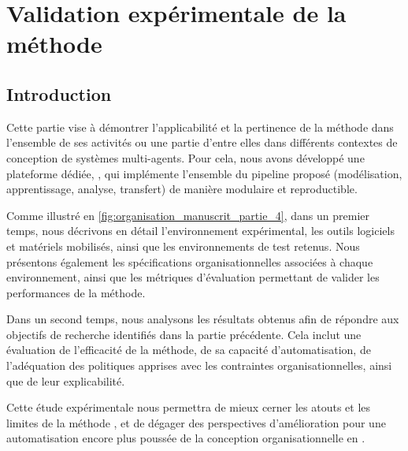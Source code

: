 \cleardoublepage
{}
\part{Validation expérimentale de la méthode}

\chapter*{Introduction}
\label{part:experimentation}


\noindent
Cette partie vise à démontrer l'applicabilité et la pertinence de la méthode  dans l'ensemble de ses activités ou une partie d'entre elles dans différents contextes de conception de systèmes multi-agents. Pour cela, nous avons développé une plateforme dédiée, , qui implémente l'ensemble du pipeline proposé (modélisation, apprentissage, analyse, transfert) de manière modulaire et reproductible.

\medskip

\noindent
Comme illustré en \autoref{fig:organisation_manuscrit_partie_4}, dans un premier temps, nous décrivons en détail l'environnement expérimental, les outils logiciels et matériels mobilisés, ainsi que les environnements de test retenus. Nous présentons également les spécifications organisationnelles associées à chaque environnement, ainsi que les métriques d'évaluation permettant de valider les performances de la méthode.

\medskip

\noindent
Dans un second temps, nous analysons les résultats obtenus afin de répondre aux objectifs de recherche identifiés dans la partie précédente. Cela inclut une évaluation de l'efficacité de la méthode, de sa capacité d'automatisation, de l'adéquation des politiques apprises avec les contraintes organisationnelles, ainsi que de leur explicabilité.

\medskip

\noindent
Cette étude expérimentale nous permettra de mieux cerner les atouts et les limites de la méthode , et de dégager des perspectives d'amélioration pour une automatisation encore plus poussée de la conception organisationnelle en .



